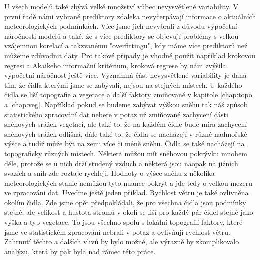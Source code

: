 U všech modelů také zbývá velké množství vůbec nevysvětlené variability. V první řadě námi vybrané prediktory zdaleka nevyčerpávají informace o aktuálních meteorologických podmínkách. Více jsme jich nevybrali z důvodu výpočetní náročnosti modelů a také, že s více prediktory se objevují problémy s velkou vzájemnou korelací a takzvanému "overfittingu", kdy máme více prediktorů než můžeme zdůvodnit daty. Pro takové případy je vhodné použít například krokovou regresi a Akaikeho informační kritérium, kroková regrese by nám zvýšila výpočetní náročnost ještě více. Významná část nevysvětlené variability je daná tím, že čidla kterými jsme se zabývali, nejsou na stejných místech. U každého čidla se liší topografie a vegetace a další faktory zmiňované v kapitole \ref{chap:topo} a \ref{chap:veg}. Například pokud se budeme zabývat výškou sněhu tak náš způsob statistického zpracování dat nebere v potaz už zmiňované zachycení části sněhových srážek vegetací, ale také to, že na každém čidle bude míra zachycení sněhových srážek odlišná, dále také to, že čidla se nacházejí v různé nadmořské výšce a tudíž může být na zemi více či méně sněhu. Čidla se také nacházejí na topograficky různých místech. Některá můžou mít sněhovou pokrývku mnohem déle, protože se u nich drží studený vzduch a některá jsou naopak na jižních svazích a sníh zde roztaje rychleji. Hodnoty o výšce sněhu z několika meteorologických stanic nemůžou tyto nuance pokrýt a jde tedy o velkou mezeru ve zpracování dat. Uveďme ještě jeden příklad. Rychlost větru je také ovlivněna okolím čidla. Zde jsme opět předpokládali, že pro všechna čidla jsou podmínky stejné, ale velikost a hustota stromů v okolí se liší pro každý pár čidel stejně jako výška a typ vegetace. To jsou všechno spolu s lokální topografií faktory, které jsme ve statistickém zpracování nebrali v potaz a ovlivňují rychlost větru. Zahrnutí těchto a dalších vlivů by bylo možné, ale výrazně by zkomplikovalo analýzu, která by pak byla nad rámec této práce.
